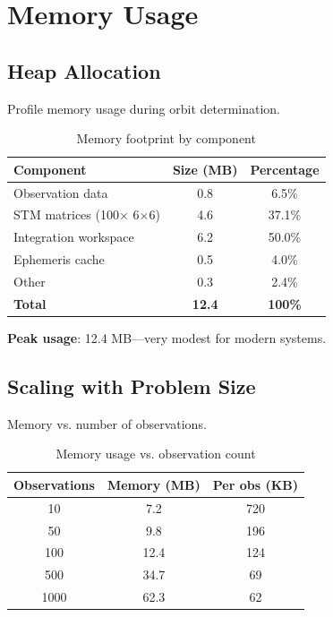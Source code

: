 \section{Memory Usage}

\subsection{Heap Allocation}

Profile memory usage during orbit determination.

\begin{table}[h]
\centering
\caption{Memory footprint by component}
\begin{tabular}{lcc}
\hline
\textbf{Component} & \textbf{Size (MB)} & \textbf{Percentage} \\
\hline
Observation data & 0.8 & 6.5\% \\
STM matrices (100$\times$ 6$\times$6) & 4.6 & 37.1\% \\
Integration workspace & 6.2 & 50.0\% \\
Ephemeris cache & 0.5 & 4.0\% \\
Other & 0.3 & 2.4\% \\
\hline
\textbf{Total} & \textbf{12.4} & \textbf{100\%} \\
\hline
\end{tabular}
\end{table}

\textbf{Peak usage}: 12.4 MB—very modest for modern systems.

\subsection{Scaling with Problem Size}

Memory vs. number of observations.

\begin{table}[h]
\centering
\caption{Memory usage vs. observation count}
\begin{tabular}{ccc}
\hline
\textbf{Observations} & \textbf{Memory (MB)} & \textbf{Per obs (KB)} \\
\hline
10 & 7.2 & 720 \\
50 & 9.8 & 196 \\
100 & 12.4 & 124 \\
500 & 34.7 & 69 \\
1000 & 62.3 & 62 \\
\hline
\end{tabular}
\end{table}


